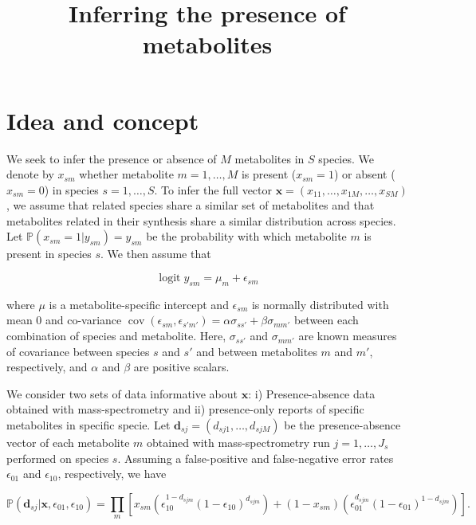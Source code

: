 \documentclass[a4paper,10pt]{article}
\title{Inferring the presence of metabolites}
\DeclareMathOperator{\logit}{logit}
\DeclareMathOperator{\cov}{cov}
\def\P{\mathbb{P}}
\def\x{\boldsymbol{x}}
\def\d{\boldsymbol{d}}
\begin{document}
\maketitle

\section{Idea and concept}
	
	We seek to infer the presence or absence of $M$ metabolites in $S$ species. We denote by $x_{sm}$ whether metabolite $m=1,\ldots,M$ is present ($x_{sm}=1$) or absent ($x_{sm}=0$) in species $s=1,\ldots,S$. To infer the full vector $\x=(x_{11}, \ldots, x_{1M},\ldots,x_{SM})$, we assume that related species share a similar set of metabolites and that metabolites related in their synthesis share a similar distribution across species. 
	Let $\P(x_{sm}=1|y_{sm})=y_{sm}$ be the probability with which metabolite $m$ is present in species $s$. We then assume that
	
	\begin{equation*}
	 \logit y_{sm} = \mu_m + \epsilon_{sm}
	\end{equation*}
	
	where $\mu$ is a metabolite-specific intercept and $\epsilon_{sm}$ is normally distributed with mean 0 and co-variance $\cov(\epsilon_{sm},\epsilon_{s'm'})=\alpha \sigma_{ss'} + \beta \sigma_{mm'}$ between each combination of species and metabolite. Here, $\sigma_{ss'}$ and $\sigma_{mm'}$ are known measures of covariance between species $s$ and $s'$ and between metabolites $m$ and $m'$, respectively, and $\alpha$ and $\beta$ are positive scalars.
	
	We consider two sets of data informative about $\x$: i) Presence-absence data obtained with mass-spectrometry and ii) presence-only reports of specific metabolites in specific specie. Let $\d_{sj}=(d_{sj1}, \ldots, d_{sjM})$ be the presence-absence vector of each metabolite $m$ obtained with mass-spectrometry run $j=1,\ldots,J_s$ performed on species $s$. Assuming a false-positive and false-negative error rates $\epsilon_{01}$ and $\epsilon_{10}$, respectively, we have
	
	\begin{equation*}
	 \P(\d_{sj}|\x, \epsilon_{01}, \epsilon_{10}) = \prod_m \left[ x_{sm}\left(\epsilon_{10}^{1-d_{sjm}}(1-\epsilon_{10})^{d_{sjm}}\right) + (1-x_{sm})\left( \epsilon_{01}^{d_{sjm}}(1-\epsilon_{01})^{1-d_{sjm}}\right)\right].
	\end{equation*}
	
\end{document}
